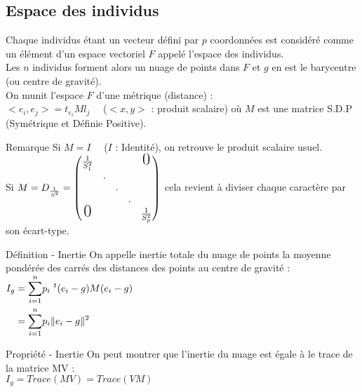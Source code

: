 \documentclass[a4paper, 12pt]{article}
\begin{document}
\subsection{Espace des individus}
Chaque individus étant un vecteur défini par $p$ coordonnées est considéré comme un élément d'un espace vectoriel $F$ appelé l'espace des individus. \\
Les $n$ individus forment alors un nuage de points dans $F$ et $g$ en est le barycentre (ou centre de gravité). \\
On munit l'espace $F$ d'une métrique (distance) : \\
$<e_i, e_j> = t_{e_i} M l_j \quad$ ($<x, y>$ : produit scalaire)
où $M$ est une matrice S.D.P (Symétrique et Définie Positive). \\

\begin{remarque}{Remarque}
Si $M = I \quad$ ($I$ : Identité), on retrouve le produit scalaire usuel. \\
Si $M = D_{\frac{1}{S^2}} = 
\begin{pmatrix}
\frac{1}{S^2_1} & & & & \text{\LARGE 0} \\
& . & & & \\
& & . & & \\
& & & . & \\
\text{\LARGE 0} & & & & \frac{1}{S^2_p} \\
\end{pmatrix}
$
cela revient à diviser chaque caractère par son écart-type.
\end{remarque}

\begin{definition}{Définition - Inertie}
On appelle inertie totale du nuage de points la moyenne pondérée des carrés des distances des points au centre de gravité : \\
$
\begin{aligned}
I_g &= \overset{n}{\underset{i = 1}{\sum}} p_i \ ^t(e_i - g) M(e_i - g) \\
&= \overset{n}{\underset{i = 1}{\sum}} p_i \|e_i - g\|^2 \\
\end{aligned} \\
$
\end{definition}

\begin{propriete}{Propriété - Inertie}
On peut montrer que l'inertie du nuage est égale à le trace de la matrice MV : \\
$\boxed{I_g = Trace (MV) = Trace (VM)}$
\end{propriete}
\end{document}
